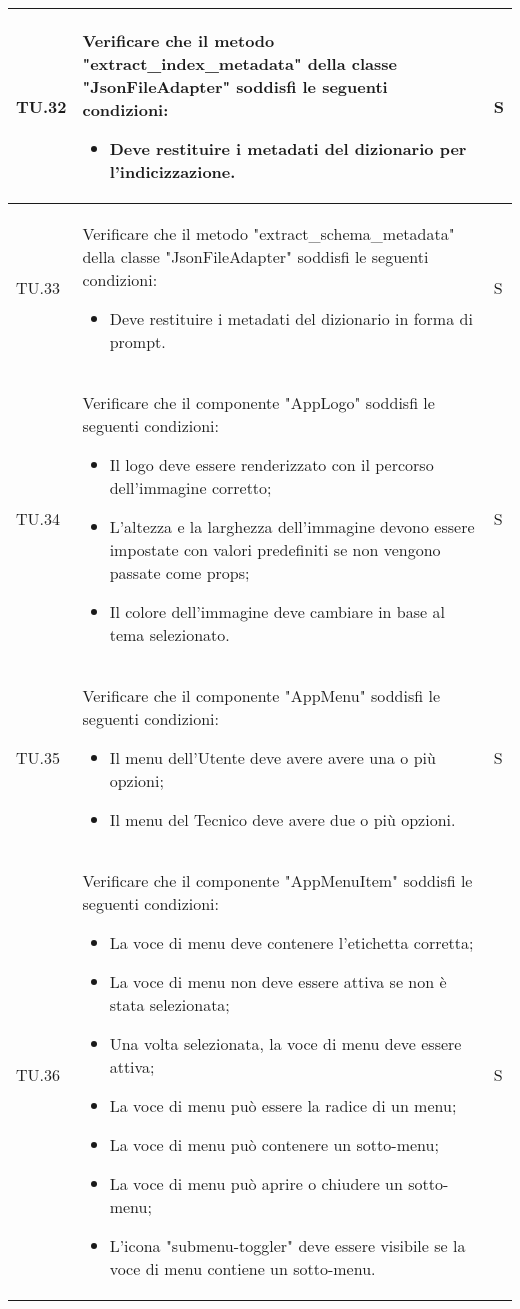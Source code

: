 \begin{adjustwidth}{-0.5cm}{-0.5cm}
\begin{longtable}{|P{1.5cm}|>{\raggedright}P{9.5cm}|>{\arraybackslash}P{1.5cm}|}
		\hline TU.32 & Verificare che il metodo "extract\_index\_metadata" della classe "JsonFileAdapter" soddisfi le seguenti condizioni:
		\begin{itemize}
			\item Deve restituire i metadati del dizionario per l'indicizzazione.
		\end{itemize} & S \\

		\hline TU.33 & Verificare che il metodo "extract\_schema\_metadata" della classe "JsonFileAdapter" soddisfi le seguenti condizioni:
		\begin{itemize}
			\item Deve restituire i metadati del dizionario in forma di prompt.
		\end{itemize} & S \\

		\hline TU.34 & Verificare che il componente "AppLogo" soddisfi le seguenti condizioni:
    \begin{itemize}
      \item Il logo deve essere renderizzato con il percorso dell'immagine corretto;
			\item L'altezza e la larghezza dell'immagine devono essere impostate con valori predefiniti se non vengono passate come props;
			\item Il colore dell'immagine deve cambiare in base al tema selezionato.
    \end{itemize} & S \\

		\hline TU.35 & Verificare che il componente "AppMenu" soddisfi le seguenti condizioni:
    \begin{itemize}
      \item Il menu dell'Utente deve avere avere una o più opzioni;
			\item Il menu del Tecnico deve avere due o più opzioni.
    \end{itemize} & S \\

		\hline TU.36 & Verificare che il componente "AppMenuItem" soddisfi le seguenti condizioni:
    \begin{itemize}
      \item La voce di menu deve contenere l'etichetta corretta;
			\item La voce di menu non deve essere attiva se non è stata selezionata;
			\item Una volta selezionata, la voce di menu deve essere attiva;
			\item La voce di menu può essere la radice di un menu;
			\item La voce di menu può contenere un sotto-menu;
			\item La voce di menu può aprire o chiudere un sotto-menu;
			\item L'icona "submenu-toggler" deve essere visibile se la voce di menu contiene un sotto-menu.
    \end{itemize} & S \\


\end{longtable}
\end{adjustwidth}
